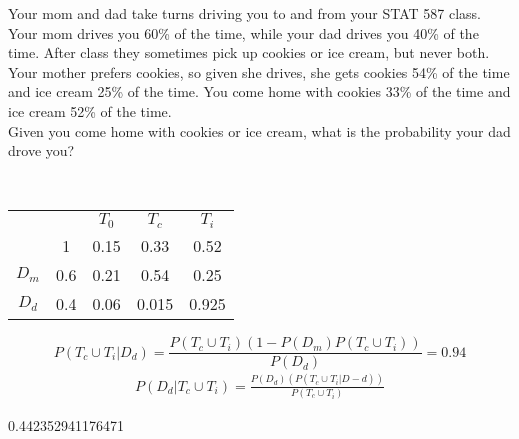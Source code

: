 \documentclass[answers]{exam}
\begin{document}
\begin{questions}
\question 
Your mom and dad take turns driving you to and from your STAT 587 class. Your mom drives you 60\% of the time, while your dad drives you 40\% of the time. After class they sometimes pick up cookies or ice cream, but never both. Your mother prefers cookies, so given she drives, she gets cookies 54\% of the time and ice cream 25\% of the time. You come home with cookies 33\% of the time and ice cream 52\% of the time. \\
Given you come home with cookies or ice cream, what is the probability your dad drove you?
\begin{solution} \\
	\begin{tabular}{cc|ccc}
		&  & $T_0$ & $T_c$ & $T_i$ \\
		& 1 & 0.15 & 0.33 & 0.52 \\
		\hline
		$D_m$ & 0.6 & 0.21 & 0.54 & 0.25 \\
		$D_d$ & 0.4 & 0.06 & 0.015 & 0.925 \\
		\hline
	\end{tabular}
	\begin{equation*}
		P(T_c\cup T_i|D_d) = \frac{P(T_c\cup T_i)(1-P(D_m)P(T_c\cup T_i))}{P(D_d)}
		= 0.94
	\end{equation*}
	\begin{align*}
		P(D_d|T_c\cup T_i) = \frac{P(D_d)(P(T_c\cup T_i|D-d))}{P(T_c\cup T_i)}
	\end{align*}
		
\end{solution}

0.442352941176471




\question 

\begin{solution}
	
\end{solution}
	
\question 

\begin{solution}
	
\end{solution}

\end{questions}
\end{document}
